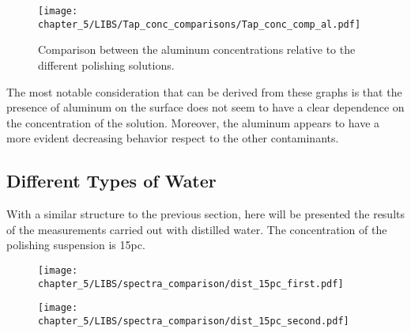 \begin{figure}[H]
   \centering
   \texttt{[image: chapter\_5/LIBS/Tap\_conc\_comparisons/Tap\_conc\_comp\_al.pdf]} 
   \vspace*{-30pt}
   \caption{Comparison between the aluminum concentrations relative to the different polishing solutions.}
   \label{fig:tap_conc_comp_al}
\end{figure}

The most notable consideration that can be derived from these graphs is that the presence of aluminum on the surface does not seem to have a clear dependence on the concentration of the solution. Moreover, the aluminum appears to have a more evident decreasing behavior respect to the other contaminants. 

\subsection{Different Types of Water}
\label{subsec:different_type_of_water}

With a similar structure to the previous section, here will be presented the results of the measurements carried out with distilled water. The concentration of the polishing suspension is 15pc.

\begin{figure}[H]
    \centering
    \texttt{[image: chapter\_5/LIBS/spectra\_comparison/dist\_15pc\_first.pdf]} 
 \end{figure}

\vspace*{-68pt}
\begin{figure}[H]
    \centering
    \texttt{[image: chapter\_5/LIBS/spectra\_comparison/dist\_15pc\_second.pdf]} 
 \end{figure}

